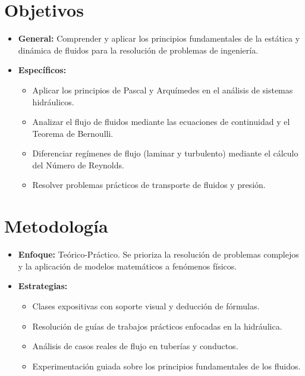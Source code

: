 \section*{Objetivos}
\begin{itemize}[label=\textbullet]
    \item \textbf{General:} Comprender y aplicar los principios fundamentales de la estática y dinámica de fluidos para la resolución de problemas de ingeniería.
    \item \textbf{Específicos:}
    \begin{itemize}
        \item Aplicar los principios de Pascal y Arquímedes en el análisis de sistemas hidráulicos.
        \item Analizar el flujo de fluidos mediante las ecuaciones de continuidad y el Teorema de Bernoulli.
        \item Diferenciar regímenes de flujo (laminar y turbulento) mediante el cálculo del Número de Reynolds.
        \item Resolver problemas prácticos de transporte de fluidos y presión.
    \end{itemize}
\end{itemize}

\section*{Metodología}
\begin{itemize}[label=\textbullet]
    \item \textbf{Enfoque:} Teórico-Práctico. Se prioriza la resolución de problemas complejos y la aplicación de modelos matemáticos a fenómenos físicos.
    \item \textbf{Estrategias:}
    \begin{itemize}
        \item Clases expositivas con soporte visual y deducción de fórmulas.
        \item Resolución de guías de trabajos prácticos enfocadas en la hidráulica.
        \item Análisis de casos reales de flujo en tuberías y conductos.
        \item Experimentación guiada sobre los principios fundamentales de los fluidos.
    \end{itemize}
\end{itemize}

